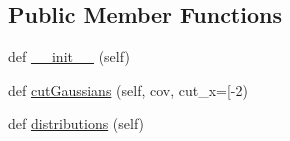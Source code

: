 \subsection*{Public Member Functions}
\begin{DoxyCompactItemize}
\item 
def \mbox{\hyperlink{classgetdist__tests_1_1test__distributions_1_1Test2DDistributions_ae6f29110bd438d1026c6bbd3e3c2df94}{\+\_\+\+\_\+init\+\_\+\+\_\+}} (self)
\item 
def \mbox{\hyperlink{classgetdist__tests_1_1test__distributions_1_1Test2DDistributions_af060efdef236b6fde5afdc6e03d0bce3}{cut\+Gaussians}} (self, cov, cut\+\_\+x=\mbox{[}-\/2)
\item 
def \mbox{\hyperlink{classgetdist__tests_1_1test__distributions_1_1Test2DDistributions_a185674b641d764cadf356cae3fa2e9f2}{distributions}} (self)
\end{DoxyCompactItemize}
